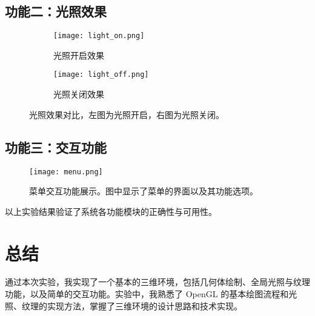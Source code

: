 \documentclass[11pt,a4paper]{article}
\begin{document}
\subsection{功能二：光照效果}
\begin{figure}[H]
    \centering
    \begin{subfigure}[b]{0.48\textwidth}
        \centering
        \texttt{[image: light\_on.png]} %
        \caption{光照开启效果}
        \label{fig:light_on}
    \end{subfigure}
    \hfill
    \begin{subfigure}[b]{0.48\textwidth}
        \centering
        \texttt{[image: light\_off.png]} %
        \caption{光照关闭效果}
        \label{fig:light_off}
    \end{subfigure}
    \caption{光照效果对比，左图为光照开启，右图为光照关闭。}
    \label{fig:light_effect}
\end{figure}

\subsection{功能三：交互功能}
\begin{figure}[H]
    \centering
    \texttt{[image: menu.png]} %
    \caption{菜单交互功能展示。图中显示了菜单的界面以及其功能选项。}
    \label{fig:menu_interaction}
\end{figure}


以上实验结果验证了系统各功能模块的正确性与可用性。



\section{总结}
通过本次实验，我实现了一个基本的三维环境，包括几何体绘制、全局光照与纹理功能，以及简单的交互功能。实验中，我熟悉了 OpenGL 的基本绘图流程和光照、纹理的实现方法，掌握了三维环境的设计思路和技术实现。
\end{document}
